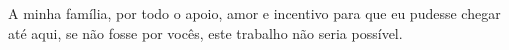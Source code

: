 \begin{dedicatoria}
\vspace*{\fill}
\begin{flushright}
\begin{minipage}{0.5\textwidth}
        
    A minha família, por todo o apoio, amor e incentivo para que eu pudesse chegar até aqui, se não fosse por vocês, este trabalho não seria possível.

\end{minipage}
\end{flushright}
\vspace*{3cm}
\end{dedicatoria}